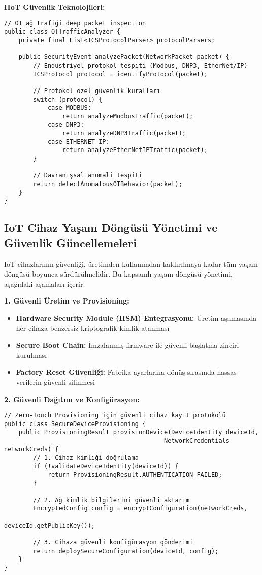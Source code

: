 \textbf{IIoT Güvenlik Teknolojileri:}
\begin{lstlisting}[breaklines=true,basicstyle=\ttfamily\footnotesize]
// OT ağ trafiği deep packet inspection
public class OTTrafficAnalyzer {
    private final List<ICSProtocolParser> protocolParsers;
    
    public SecurityEvent analyzePacket(NetworkPacket packet) {
        // Endüstriyel protokol tespiti (Modbus, DNP3, EtherNet/IP)
        ICSProtocol protocol = identifyProtocol(packet);
        
        // Protokol özel güvenlik kuralları
        switch (protocol) {
            case MODBUS:
                return analyzeModbusTraffic(packet);
            case DNP3:
                return analyzeDNP3Traffic(packet);
            case ETHERNET_IP:
                return analyzeEtherNetIPTraffic(packet);
        }
        
        // Davranışsal anomali tespiti
        return detectAnomalousOTBehavior(packet);
    }
}
\end{lstlisting}

\subsection{IoT Cihaz Yaşam Döngüsü Yönetimi ve Güvenlik Güncellemeleri}

IoT cihazlarının güvenliği, üretimden kullanımdan kaldırılmaya kadar tüm yaşam döngüsü boyunca sürdürülmelidir. Bu kapsamlı yaşam döngüsü yönetimi, aşağıdaki aşamaları içerir:

\textbf{1. Güvenli Üretim ve Provisioning:}
\begin{itemize}
    \item \textbf{Hardware Security Module (HSM) Entegrasyonu:} Üretim aşamasında her cihaza benzersiz kriptografik kimlik atanması
    \item \textbf{Secure Boot Chain:} İmzalanmış firmware ile güvenli başlatma zinciri kurulması
    \item \textbf{Factory Reset Güvenliği:} Fabrika ayarlarına dönüş sırasında hassas verilerin güvenli silinmesi
\end{itemize}

\textbf{2. Güvenli Dağıtım ve Konfigürasyon:}
\begin{lstlisting}[breaklines=true,basicstyle=\ttfamily\footnotesize]
// Zero-Touch Provisioning için güvenli cihaz kayıt protokolü
public class SecureDeviceProvisioning {
    public ProvisioningResult provisionDevice(DeviceIdentity deviceId, 
                                            NetworkCredentials networkCreds) {
        // 1. Cihaz kimliği doğrulama
        if (!validateDeviceIdentity(deviceId)) {
            return ProvisioningResult.AUTHENTICATION_FAILED;
        }
        
        // 2. Ağ kimlik bilgilerini güvenli aktarım
        EncryptedConfig config = encryptConfiguration(networkCreds, 
                                                     deviceId.getPublicKey());
        
        // 3. Cihaza güvenli konfigürasyon gönderimi
        return deploySecureConfiguration(deviceId, config);
    }
}
\end{lstlisting}

